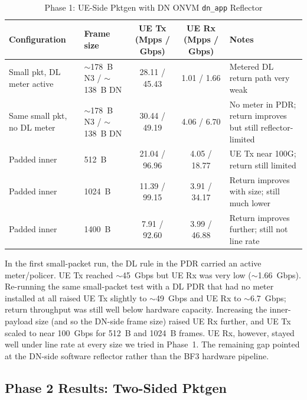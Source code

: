 \documentclass[conference]{IEEEtran}
\newcommand{\code}[1]{\nolinkurl{#1}}
\begin{document}
\begin{table}[t]
  \centering
  \caption{Phase 1: UE-Side Pktgen with DN ONVM \code{dn_app} Reflector}
  \label{tab:reflector}
  \footnotesize
  \setlength{\tabcolsep}{4pt}
  \begin{tabular}{@{}p{}p{}cc p{}@{}}
    \toprule
    Configuration                        & Frame size                       & UE Tx (Mpps / Gbps) & UE Rx (Mpps / Gbps) & Notes \\
    \midrule
    Small pkt, DL meter active           & $\sim$178~B N3 / $\sim$138~B DN  & 28.11 / 45.43       & 1.01 / 1.66         & Metered DL return path very weak \\
    Same small pkt, no DL meter          & $\sim$178~B N3 / $\sim$138~B DN  & 30.44 / 49.19       & 4.06 / 6.70         & No meter in PDR; return improves but still reflector-limited \\
    Padded inner                         & 512~B                            & 21.04 / 96.96       & 4.05 / 18.77        & UE Tx near 100G; return still limited \\
    Padded inner                         & 1024~B                           & 11.39 / 99.15       & 3.91 / 34.17        & Return improves with size; still much lower \\
    Padded inner                         & 1400~B                           & 7.91 / 92.60        & 3.99 / 46.88        & Return improves further; still not line rate \\
    \bottomrule
  \end{tabular}
\end{table}

In the first small-packet run, the DL rule in the PDR carried an
active meter/policer.  UE Tx reached $\sim$45~Gbps but UE Rx was
very low ($\sim$1.66~Gbps).  Re-running the same small-packet test
with a DL PDR that had no meter installed at all raised UE Tx
slightly to $\sim$49~Gbps and UE Rx to $\sim$6.7~Gbps; return
throughput was still well below hardware capacity.  Increasing the
inner-payload size (and so the DN-side frame size) raised UE Rx
further, and UE Tx scaled to near 100~Gbps for 512~B and 1024~B
frames.  UE Rx, however, stayed well under line rate at every size
we tried in Phase~1.  The remaining gap pointed at the DN-side
software reflector rather than the BF3 hardware pipeline.

\subsection{Phase 2 Results: Two-Sided Pktgen}
\end{document}
